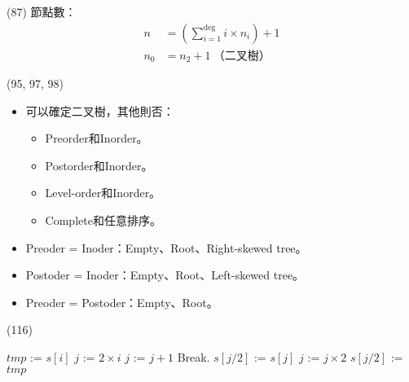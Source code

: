 \item \begin{theorem}{(87)} 節點數：\begin{equation}
        \begin{aligned}
            n & = (\sum_{i = 1}^{\deg}i \times n_i) + 1 \\
            n_0 & = n_2 + 1 \ \text{（二叉樹）}
        \end{aligned}
    \end{equation}
\end{theorem}

\item \begin{theorem}{(95, 97, 98)} \quad\quad \begin{itemize}
        \item 可以確定二叉樹，其他則否：\begin{itemize}
            \item Preorder和Inorder。
            \item Postorder和Inorder。
            \item Level-order和Inorder。
            \item Complete和任意排序。
        \end{itemize}
        \item Preoder = Inoder：Empty、Root、Right-skewed tree。
        \item Postoder = Inoder：Empty、Root、Left-skewed tree。
        \item Preoder = Postoder：Empty、Root。
    \end{itemize}
\end{theorem}

\item \begin{theorem}{(116)} \quad\quad
    \begin{algorithm}[H]
        \begin{algorithmic}[1]
                 
                    \State $tmp$ := $s[i]$
                    \State $j$ := $2 \times i$ 
                     
                         
                             
                                \State $j$ := $j + 1$
                            \EndIf
                        \EndIf
                            \State Break.
                        \Else {}
                            \State $s[j / 2]$ := $s[j]$
                            \State $j$ := $j \times 2$
                        \EndIf
                    \EndWhile
                    \State $s[j / 2]$ := $tmp$
                \EndFor
            \EndFunction
        \end{algorithmic}
    \end{algorithm} 
\end{theorem}
